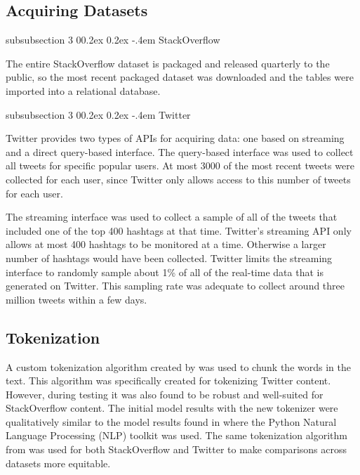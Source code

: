 \documentclass[man,floatsintext,donotrepeattitle]{apa6}
\makeatletter
\renewcommand{\subsubsection}{%
  \@startsection
  {subsubsection}%
  {3}%
  {\parindent}%
  {0\baselineskip \@plus 0.2ex \@minus 0.2ex}%
  {-.4em}%
  {\normalfont\normalsize\bfseries\addperi}}
\makeatother
\begin{document}
\subsection{Acquiring Datasets}

\subsubsection{StackOverflow}

The entire StackOverflow dataset is packaged and released quarterly to the public,
so the most recent packaged dataset was downloaded and the tables were imported into a relational database.

\subsubsection{Twitter}

Twitter provides two types of APIs for acquiring data: one based on streaming and a direct query-based interface.
The query-based interface was used to collect all tweets for specific popular users.
At most \num{3000} of the most recent tweets were collected for each user, since Twitter only allows access to this number of tweets for each user.

The streaming interface was used to collect a sample of all of the tweets that included one of the top 400 hashtags at that time.
Twitter's streaming API only allows at most 400 hashtags to be monitored at a time.
Otherwise a larger number of hashtags would have been collected.
Twitter limits the streaming interface to randomly sample about 1\% of all of the real-time data that is generated on Twitter.
This sampling rate was adequate to collect around three million tweets within a few days.

\subsection{Tokenization}

A custom tokenization algorithm created by \textcite{Owoputi2013} was used to chunk the words in the text.
This algorithm was specifically created for tokenizing Twitter content.
However, during testing it was also found to be robust and well-suited for StackOverflow content.
The initial model results with the new tokenizer were qualitatively similar to the model results found in \textcite{Stanley2013} where the Python Natural Language Processing (NLP) toolkit \parencite{Bird2009} was used.
The same tokenization algorithm from \textcite{Owoputi2013} was used for both StackOverflow and Twitter to make comparisons across datasets more equitable.
\end{document}
